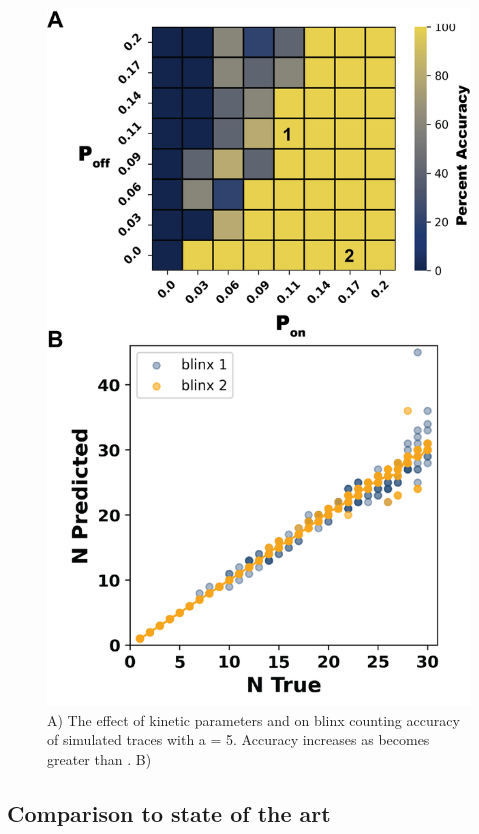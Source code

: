 \begin{figure}[ht]
  \includegraphics[width=\linewidth]{figures/kinetic_regime}
  \caption{A) The effect of kinetic parameters \pon and \poff on blinx counting accuracy of simulated traces with a \truen = 5. Accuracy increases as \pon becomes greater than \poff. B) }
  \label{fig:results:regime}
\end{figure}

\subsection{Comparison to state of the art \lbfcs}

